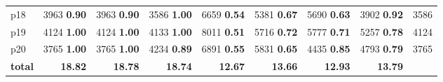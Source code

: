 \begin{tabular}{|l|rrrrrrr|r|}
p18 & {\footnotesize 3963} \textbf{0.90} & {\footnotesize 3963} \textbf{0.90} & {\footnotesize 3586} \textbf{1.00} & {\footnotesize 6659} \textbf{0.54} & {\footnotesize 5381} \textbf{0.67} & {\footnotesize 5690} \textbf{0.63} & {\footnotesize 3902} \textbf{0.92} & 3586\\
p19 & {\footnotesize 4124} \textbf{1.00} & {\footnotesize 4124} \textbf{1.00} & {\footnotesize 4133} \textbf{1.00} & {\footnotesize 8011} \textbf{0.51} & {\footnotesize 5716} \textbf{0.72} & {\footnotesize 5777} \textbf{0.71} & {\footnotesize 5257} \textbf{0.78} & 4124\\
p20 & {\footnotesize 3765} \textbf{1.00} & {\footnotesize 3765} \textbf{1.00} & {\footnotesize 4234} \textbf{0.89} & {\footnotesize 6891} \textbf{0.55} & {\footnotesize 5831} \textbf{0.65} & {\footnotesize 4435} \textbf{0.85} & {\footnotesize 4793} \textbf{0.79} & 3765\\
\hline
\textbf{total} & \textbf{18.82} & \textbf{18.78} & \textbf{18.74} & \textbf{12.67} & \textbf{13.66} & \textbf{12.93} & \textbf{13.79} & \\
\hline
\end{tabular}

